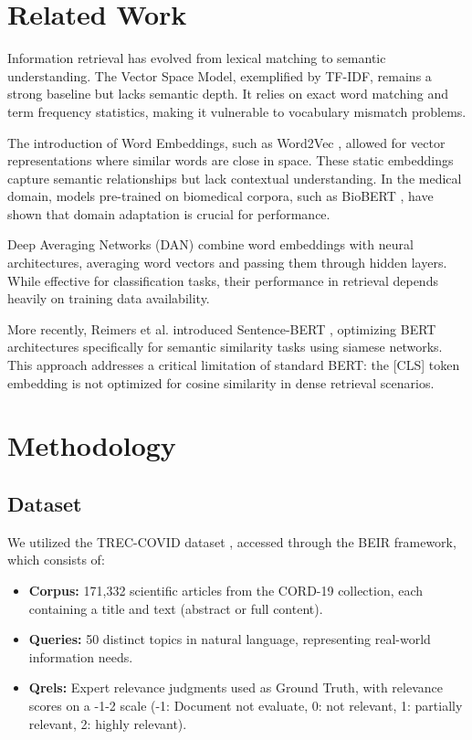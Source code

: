 \documentclass[sigconf,nonacm]{acmart}
\begin{document}
\section{Related Work}
Information retrieval has evolved from lexical matching to semantic understanding. The Vector Space Model, exemplified by TF-IDF, remains a strong baseline but lacks semantic depth. It relies on exact word matching and term frequency statistics, making it vulnerable to vocabulary mismatch problems.

The introduction of Word Embeddings, such as Word2Vec \cite{mikolov2013efficient}, allowed for vector representations where similar words are close in space. These static embeddings capture semantic relationships but lack contextual understanding. In the medical domain, models pre-trained on biomedical corpora, such as BioBERT \cite{lee2020biobert}, have shown that domain adaptation is crucial for performance.

Deep Averaging Networks (DAN) \cite{iyyer2015deep} combine word embeddings with neural architectures, averaging word vectors and passing them through hidden layers. While effective for classification tasks, their performance in retrieval depends heavily on training data availability.

More recently, Reimers et al. introduced Sentence-BERT \cite{reimers2019sentence}, optimizing BERT architectures specifically for semantic similarity tasks using siamese networks. This approach addresses a critical limitation of standard BERT: the [CLS] token embedding is not optimized for cosine similarity in dense retrieval scenarios.

\section{Methodology}

\subsection{Dataset}
We utilized the TREC-COVID dataset \cite{thakur2021beir}, accessed through the BEIR framework, which consists of:
\begin{itemize}
    \item \textbf{Corpus:} 171,332 scientific articles from the CORD-19 collection, each containing a title and text (abstract or full content).
    \item \textbf{Queries:} 50 distinct topics in natural language, representing real-world information needs.
    \item \textbf{Qrels:} Expert relevance judgments used as Ground Truth, with relevance scores on a -1-2 scale (-1: Document not evaluate, 0: not relevant, 1: partially relevant, 2: highly relevant).
\end{itemize}
\end{document}
